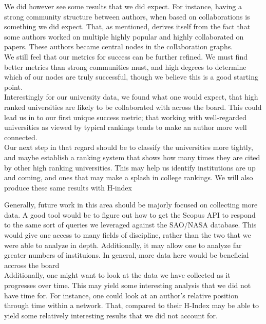 \documentclass[times, 10pt,twocolumn]{article}
\begin{document}
We did however see some results that we did expect. For instance, having a strong community structure between authors, when based on collaborations is something we did expect. That, as mentioned, derives itself from the fact that some authors worked on multiple highly popular and highly collaborated on papers. These authors became central nodes in the collaboration graphs. \\

We still feel that our metrics for success can be further refined. We must find better metrics than strong communities must, and high degrees to determine which of our nodes are truly successful, though we believe this is a good starting point.\\

Interestingly for our university data, we found what one would expect, that high ranked universities are likely to be collaborated with across the board. This could lead us in to our first unique success metric; that working with well-regarded universities as viewed by typical rankings tends to make an author more well connected. \\

Our next step in that regard should be to classify the universities more tightly, and maybe establish a ranking system that shows how many times they are cited by other high ranking universities. This may help us identify institutions are up and coming, and ones that may make a splash in college rankings. We will also produce these same results with H-index

Generally, future work in this area should be majorly focused on collecting more data. A good tool would be to figure out how to get the Scopus API to respond to the same sort of queries we leveraged against the SAO/NASA database. This would give one access to many fields of discipline, rather than the two that we were able to analyze in depth. Additionally, it may allow one to analyze far greater numbers of instituions. In general, more data here would be beneficial accross the board\\

Additionally, one might want to look at the data we have collected as it progresses over time. This may yield some interesting analysis that we did not have time for. For instance, one could look at an author's relative position through time within a network. That, compared to their H-Index may be able to yield some relatively interesting results that we did not account for.\\
\end{document}
